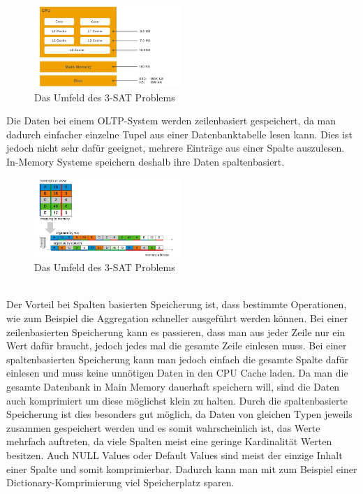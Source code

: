 \\
\begin{figure}[ht]
  \begin{center}
  \includegraphics[width=0.5\textwidth]{images/cpu.png}
  \end{center}
  \caption{Das Umfeld des 3-SAT Problems}
  \label{fig_2}
\end{figure} 
Die Daten bei einem OLTP-System werden zeilenbasiert gespeichert, da man dadurch einfacher einzelne Tupel aus einer Datenbanktabelle lesen kann. Dies ist jedoch nicht sehr dafür geeignet, mehrere Einträge aus einer Spalte auszulesen.
In-Memory Systeme speichern deshalb ihre Daten spaltenbasiert.
\begin{figure}[ht]
  \begin{center}
  \includegraphics[width=0.5\textwidth]{images/mappingtomemory.png}
  \end{center}
  \caption{Das Umfeld des 3-SAT Problems}
  \label{fig_3}
\end{figure} 
\\
Der Vorteil bei Spalten basierten Speicherung ist, dass bestimmte Operationen, wie zum Beispiel die Aggregation schneller ausgeführt werden können. Bei einer zeilenbasierten Speicherung kann es passieren, dass man aus jeder Zeile nur ein Wert dafür braucht, jedoch jedes mal die gesamte Zeile einlesen muss. Bei einer spaltenbasierten Speicherung kann man jedoch einfach die gesamte Spalte dafür einlesen und muss keine unnötigen Daten in den CPU Cache laden.
Da man die gesamte Datenbank in Main Memory dauerhaft speichern will, sind die Daten auch komprimiert um diese möglichst klein zu halten.
Durch die spaltenbasierte Speicherung ist dies besonders gut möglich, da Daten von gleichen Typen jeweils zusammen gespeichert werden und es somit wahrscheinlich ist, das Werte mehrfach auftreten, da viele Spalten meist eine geringe Kardinalität Werten besitzen. Auch NULL Values oder Default Values sind meist der einzige Inhalt einer Spalte und somit komprimierbar. Dadurch kann man mit zum Beispiel einer Dictionary-Komprimierung viel Speicherplatz sparen.
